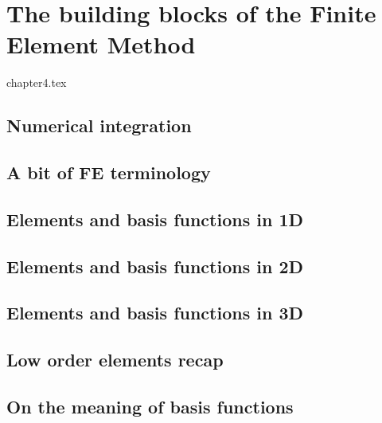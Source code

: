\chapter{The building blocks of the Finite Element Method} %

\begin{flushright} {\tiny {\color{gray} chapter4.tex}} \end{flushright}

\section{Numerical integration} \label{sec:quadrature} %
\newpage
\section{A bit of FE terminology}  %
\newpage
\section{Elements and basis functions in 1D}\label{sec:elts1D}  %
\newpage
\section{Elements and basis functions in 2D}\label{sec:shpfct2d}  %
\newpage
\section{Elements and basis functions in 3D}  %
\newpage
\section{Low order elements recap}  %
\newpage
\section{On the meaning of basis functions}  %
